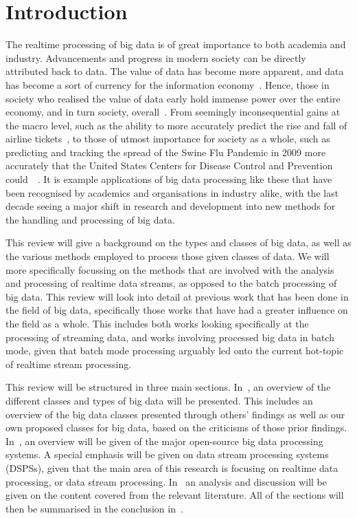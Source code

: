 \documentclass[a4paper,11pt]{article}
\begin{document}



\section{Introduction} %
\label{sec:introduction}

The realtime processing of big data is of great importance to both academia and industry. Advancements and progress in
modern society can be directly attributed back to data. The value of data has become more apparent, and data has become
a sort of currency for the information economy~\cite{st2009examining}. Hence, those in society who realised the value of
data early hold immense power over the entire economy, and in turn society, overall~\cite{lievesley1993increasing}.
From seemingly inconsequential gains at the macro level, such as the ability to more
accurately predict the rise and fall of airline tickets~\cite{darlin2006airfares}, to those of utmost importance for
society as a whole, such as predicting and tracking the spread of the Swine Flu Pandemic in 2009 more accurately that
the United States Centers for Disease Control and Prevention could~\cite{ritterman2009using}~\cite{mayer2013big}. It is
example applications of big data processing like these that have been recognised by academics and organisations in
industry alike, with the last decade seeing a major shift in research and development into new methods for the handling
and processing of big data.

This review will give a background on the types and classes of big data, as well as the various methods employed to
process those given classes of data. We will more specifically focussing on the methods that are involved with the
analysis and processing of realtime data streams, as opposed to the batch processing of big data. This review will look
into detail at previous work that has been done in the field of big data, specifically those works that have had a
greater influence on the field  as a whole. This includes both works looking specifically at the processing of streaming
data, and works involving processed big data in batch mode, given that batch mode processing arguably led onto the
current hot-topic of realtime stream processing.

This review will be structured in three main sections. In~, an overview of the different
classes and types of big data will be presented. This includes an overview of the big data classes presented through others' findings
as well as our own proposed classes for big data, based on the criticisms of those prior findings. In~,
an overview will be given of the major open-source big data processing systems. A special emphasis will be given on data stream processing
systems (DSPSs), given that the main area of this research is focusing on realtime data processing, or data stream processing.
In~ an analysis and discussion will be given on the content covered from the
relevant literature. All of the sections will then be summarised in the conclusion in~.
\end{document}
